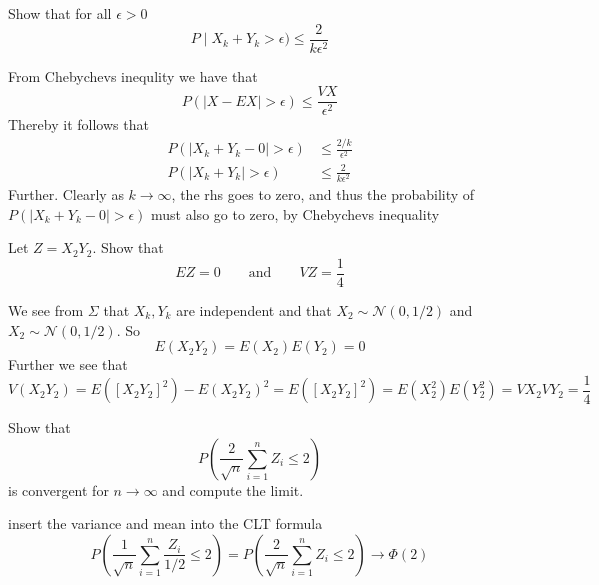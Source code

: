 \begin{problem}
Show that for all \(\epsilon>0\)
\[
	P\mid X_k+Y_k>\epsilon)\leq\frac{2}{k\epsilon^2}
\]
\end{problem}
\begin{solution}
From Chebychevs inequlity we have that
\[
	P(\mid X-EX\mid > \epsilon) \leq \frac{VX}{\epsilon^2}
\]
Thereby it follows that
\begin{align}
    P(\mid X_k+Y_k-0\mid > \epsilon) &\leq \frac{2/k}{\epsilon^2}\\
     P(\mid X_k+Y_k\mid > \epsilon) &\leq \frac{2}{k\epsilon^2}
\end{align}
Further. Clearly as \(k \rightarrow \infty\), the rhs goes to zero, and thus the probability of \(P(\mid X_k+Y_k-0\mid > \epsilon)\) must also go to zero, by Chebychevs inequality
\end{solution}
\begin{problem}
Let \(Z=X_2Y_2\). Show that
\[
	EZ=0 \qquad\text{and}\qquad VZ=\frac{1}{4}
\]

\end{problem}
\begin{solution}
We see from \(\Sigma\) that \(X_k,Y_k\) are independent and that \(X_2\sim\mathcal{N}(0,1/2)\) and \(X_2\sim\mathcal{N}(0,1/2)\). So
\[
	E(X_2Y_2)=E(X_2)E(Y_2)=0
\]
Further we see that
\[
	V(X_2Y_2)=E([X_2Y_2]^2)-E(X_2Y_2)^2=E([X_2Y_2]^2)=E(X_2^2)E(Y_2^2)=VX_2VY_2=\frac{1}{4}
\]

\end{solution}
\begin{problem}
Show that
\[
	P\left(\frac{2}{\sqrt{n}} \sum_{i=1}^n Z_i \leq 2 \right)
\]
is convergent for \(n \rightarrow \infty\) and compute the limit.
\end{problem}
\begin{solution}
insert the variance and mean into the CLT formula
\[
	P\left(\frac{1}{\sqrt{n}} \sum_{i=1}^n \frac{Z_i}{1/2} \leq 2 \right)=P\left(\frac{2}{\sqrt{n}} \sum_{i=1}^n Z_i \leq 2 \right) \rightarrow \Phi(2)
\]

\end{solution}
